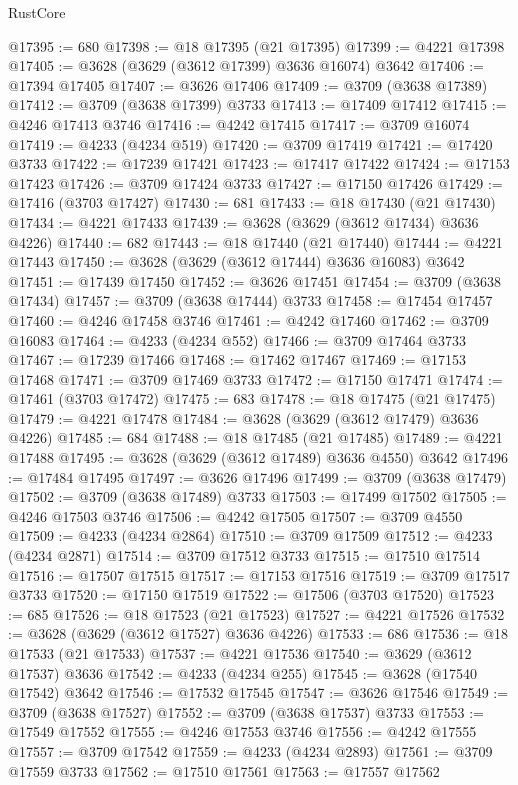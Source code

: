 \begin{lexlean}{RustCore}
\begin{coremodule}
@17395 := 680
@17398 := @18 @17395 (@21 @17395)
@17399 := @4221 @17398
@17405 := @3628 (@3629 (@3612 @17399) @3636 @16074) @3642
@17406 := @17394 @17405
@17407 := @3626 @17406
@17409 := @3709 (@3638 @17389)
@17412 := @3709 (@3638 @17399) @3733
@17413 := @17409 @17412
@17415 := @4246 @17413 @3746
@17416 := @4242 @17415
@17417 := @3709 @16074
@17419 := @4233 (@4234 @519)
@17420 := @3709 @17419
@17421 := @17420 @3733
@17422 := @17239 @17421
@17423 := @17417 @17422
@17424 := @17153 @17423
@17426 := @3709 @17424 @3733
@17427 := @17150 @17426
@17429 := @17416 (@3703 @17427)
@17430 := 681
@17433 := @18 @17430 (@21 @17430)
@17434 := @4221 @17433
@17439 := @3628 (@3629 (@3612 @17434) @3636 @4226)
@17440 := 682
@17443 := @18 @17440 (@21 @17440)
@17444 := @4221 @17443
@17450 := @3628 (@3629 (@3612 @17444) @3636 @16083) @3642
@17451 := @17439 @17450
@17452 := @3626 @17451
@17454 := @3709 (@3638 @17434)
@17457 := @3709 (@3638 @17444) @3733
@17458 := @17454 @17457
@17460 := @4246 @17458 @3746
@17461 := @4242 @17460
@17462 := @3709 @16083
@17464 := @4233 (@4234 @552)
@17466 := @3709 @17464 @3733
@17467 := @17239 @17466
@17468 := @17462 @17467
@17469 := @17153 @17468
@17471 := @3709 @17469 @3733
@17472 := @17150 @17471
@17474 := @17461 (@3703 @17472)
@17475 := 683
@17478 := @18 @17475 (@21 @17475)
@17479 := @4221 @17478
@17484 := @3628 (@3629 (@3612 @17479) @3636 @4226)
@17485 := 684
@17488 := @18 @17485 (@21 @17485)
@17489 := @4221 @17488
@17495 := @3628 (@3629 (@3612 @17489) @3636 @4550) @3642
@17496 := @17484 @17495
@17497 := @3626 @17496
@17499 := @3709 (@3638 @17479)
@17502 := @3709 (@3638 @17489) @3733
@17503 := @17499 @17502
@17505 := @4246 @17503 @3746
@17506 := @4242 @17505
@17507 := @3709 @4550
@17509 := @4233 (@4234 @2864)
@17510 := @3709 @17509
@17512 := @4233 (@4234 @2871)
@17514 := @3709 @17512 @3733
@17515 := @17510 @17514
@17516 := @17507 @17515
@17517 := @17153 @17516
@17519 := @3709 @17517 @3733
@17520 := @17150 @17519
@17522 := @17506 (@3703 @17520)
@17523 := 685
@17526 := @18 @17523 (@21 @17523)
@17527 := @4221 @17526
@17532 := @3628 (@3629 (@3612 @17527) @3636 @4226)
@17533 := 686
@17536 := @18 @17533 (@21 @17533)
@17537 := @4221 @17536
@17540 := @3629 (@3612 @17537) @3636
@17542 := @4233 (@4234 @255)
@17545 := @3628 (@17540 @17542) @3642
@17546 := @17532 @17545
@17547 := @3626 @17546
@17549 := @3709 (@3638 @17527)
@17552 := @3709 (@3638 @17537) @3733
@17553 := @17549 @17552
@17555 := @4246 @17553 @3746
@17556 := @4242 @17555
@17557 := @3709 @17542
@17559 := @4233 (@4234 @2893)
@17561 := @3709 @17559 @3733
@17562 := @17510 @17561
@17563 := @17557 @17562

\end{coremodule}
\end{lexlean}
